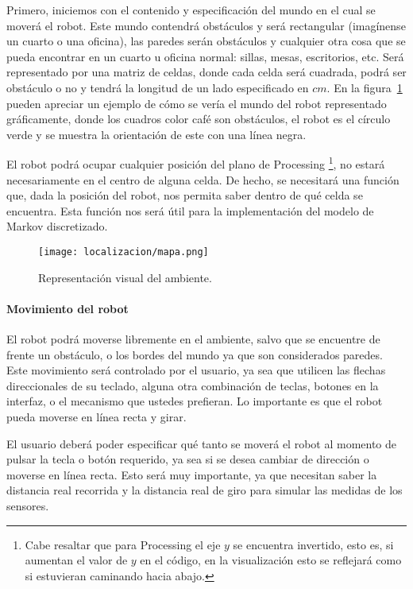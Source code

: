 \noindent Primero, iniciemos con el contenido y especificación del mundo en el cual se moverá el robot. Este mundo contendrá obstáculos y será rectangular (imagínense un cuarto o una oficina), las paredes serán obstáculos y cualquier otra cosa que se pueda encontrar en un cuarto u oficina normal: sillas, mesas, escritorios, etc. Será representado por una matriz de celdas, donde cada celda será cuadrada, podrá ser obstáculo o no y tendrá la longitud de un lado especificado en \(cm\). En la figura~\ref{fig:mapa} pueden apreciar un ejemplo de cómo se vería el mundo del robot representado gráficamente, donde los cuadros color café son obstáculos, el robot es el círculo verde y se muestra la orientación de este con una línea negra.

El robot podrá ocupar cualquier posición del plano de Processing \footnote{Cabe resaltar que para Processing el eje \(y\) se encuentra invertido, esto es, si aumentan el valor de \(y\) en el código, en la visualización esto se reflejará como si estuvieran caminando hacia abajo. }, no estará necesariamente en el centro de alguna celda. De hecho, se necesitará una función que, dada la posición del robot, nos permita saber dentro de qué celda se encuentra. Esta función nos será útil para la implementación del modelo de Markov discretizado.\par

\begin{figure}
  \centering
  \texttt{[image: localizacion/mapa.png]}
  \caption{Representación visual del ambiente.}
  \label{fig:mapa}
\end{figure}

\paragraph{Movimiento del robot}

\noindent El robot podrá moverse libremente en el ambiente, salvo que se encuentre de frente un obstáculo, o los bordes del mundo ya que son considerados paredes. Este movimiento será controlado por el usuario, ya sea que utilicen las flechas direccionales de su teclado, alguna otra combinación de teclas, botones en la interfaz, o el mecanismo que ustedes prefieran. Lo importante es que el robot pueda moverse en línea recta y girar.\par

El usuario deberá poder especificar qué tanto se moverá el robot al momento de pulsar la tecla o botón requerido, ya sea si se desea cambiar de dirección o moverse en línea recta. Esto será muy importante, ya que necesitan saber la distancia real recorrida y la distancia real de giro para simular las medidas de los sensores.

